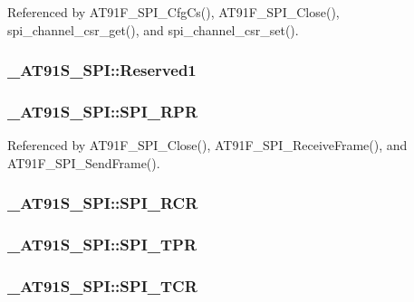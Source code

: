 Referenced by AT91F\_\-SPI\_\-CfgCs(), AT91F\_\-SPI\_\-Close(), spi\_\-channel\_\-csr\_\-get(), and spi\_\-channel\_\-csr\_\-set().\hypertarget{struct__AT91S__SPI_324199fd9f95b29e321b856b9ac9c277}{
\subsubsection{ {\bf \_\-AT91S\_\-SPI::Reserved1}}}
\label{struct__AT91S__SPI_324199fd9f95b29e321b856b9ac9c277}


\hypertarget{struct__AT91S__SPI_4a254f51f4a9ba0d9950b98e21477a96}{
\subsubsection{ {\bf \_\-AT91S\_\-SPI::SPI\_\-RPR}}}
\label{struct__AT91S__SPI_4a254f51f4a9ba0d9950b98e21477a96}




Referenced by AT91F\_\-SPI\_\-Close(), AT91F\_\-SPI\_\-ReceiveFrame(), and AT91F\_\-SPI\_\-SendFrame().\hypertarget{struct__AT91S__SPI_6227f4ced23603141013b0a810c097fc}{
\subsubsection{ {\bf \_\-AT91S\_\-SPI::SPI\_\-RCR}}}
\label{struct__AT91S__SPI_6227f4ced23603141013b0a810c097fc}


\hypertarget{struct__AT91S__SPI_742551597beffa41c6c784fded134ca6}{
\subsubsection{ {\bf \_\-AT91S\_\-SPI::SPI\_\-TPR}}}
\label{struct__AT91S__SPI_742551597beffa41c6c784fded134ca6}


\hypertarget{struct__AT91S__SPI_a8d667698c1d6f505056fe740af05e81}{
\subsubsection{ {\bf \_\-AT91S\_\-SPI::SPI\_\-TCR}}}
\label{struct__AT91S__SPI_a8d667698c1d6f505056fe740af05e81}


